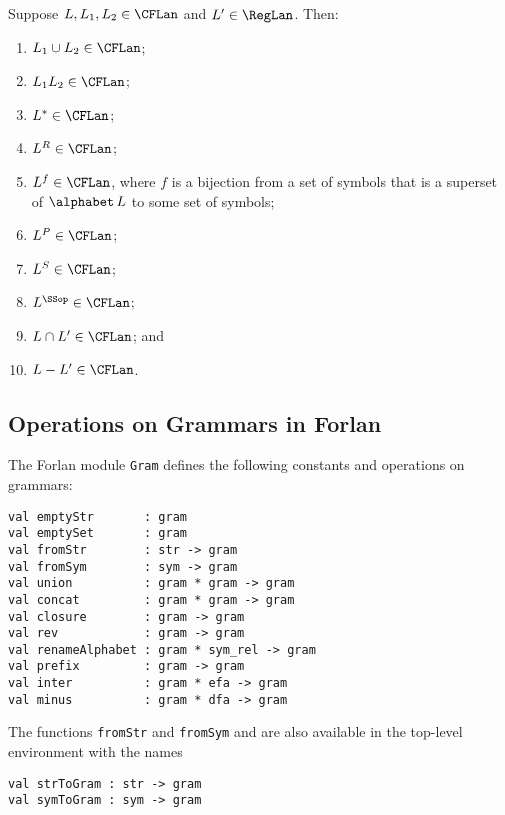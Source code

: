 \begin{theorem}
Suppose $L,L_1,L_2\in\CFLan$ and $L'\in\RegLan$.
Then:
\begin{enumerate}[\quad(1)]
\item $L_1\cup L_2\in\CFLan$;

\item $L_1L_2\in\CFLan$;

\item $L^*\in\CFLan$;

\item $L^R\in\CFLan$;

\item $L^f\in\CFLan$, where $f$ is a bijection from a set of
symbols that is a superset of $\alphabet\,L$ to some
set of symbols;

\item $L^P\in\CFLan$;

\item $L^S\in\CFLan$;

\item $L^\SSop\in\CFLan$;

\item $L\cap L'\in\CFLan$; and

\item $L-L'\in\CFLan$.
\end{enumerate}
\end{theorem}

\subsection{Operations on Grammars in Forlan}

The Forlan module \texttt{Gram} defines the following constants
and operations on grammars:
\begin{verbatim}
val emptyStr       : gram
val emptySet       : gram
val fromStr        : str -> gram
val fromSym        : sym -> gram
val union          : gram * gram -> gram
val concat         : gram * gram -> gram
val closure        : gram -> gram
val rev            : gram -> gram
val renameAlphabet : gram * sym_rel -> gram
val prefix         : gram -> gram
val inter          : gram * efa -> gram
val minus          : gram * dfa -> gram
\end{verbatim}
%
%
%
%
%
%
%
%
%
%
%
%
The functions \texttt{fromStr} and \texttt{fromSym}
and are also available in the top-level environment with the names
\begin{verbatim}
val strToGram : str -> gram
val symToGram : sym -> gram
\end{verbatim}
%
%

